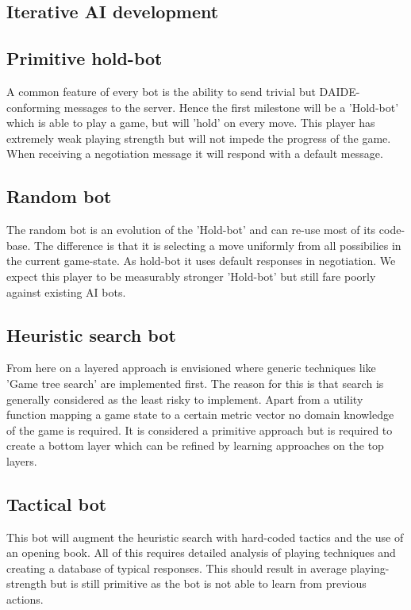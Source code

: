 \documentclass[12pt]{article}
\begin{document}
\begin{itemize}
\section{Iterative AI development}

\subsection{Primitive hold-bot}
A common feature of every bot is the ability to send trivial but DAIDE-
conforming messages to the server. Hence the first milestone will
be a 'Hold-bot' which is able to play a game, but will 'hold' on
every move. This player has extremely weak playing strength but will
not impede the progress of the game. When receiving a negotiation
message it will respond with a default message.

\subsection{Random bot}
The random bot is an evolution of the 'Hold-bot' and can re-use most
of its code-base. The difference is that it is selecting a move
uniformly from all possibilies in the current game-state. As hold-bot it 
uses default responses in negotiation. We expect this player to be measurably
stronger 'Hold-bot' but still fare poorly against existing AI bots.

\subsection{Heuristic search bot}
From here on a layered approach is envisioned where generic techniques
like 'Game tree search' are implemented first. The reason for this is that 
search is generally considered as the least risky to implement. Apart from
a utility function mapping a game state to a certain metric vector no 
domain knowledge of the game is required. It is considered a primitive
approach but is required to create a bottom layer which can be refined
by learning approaches on the top layers.

\subsection{Tactical bot}
This bot will augment the heuristic search with hard-coded tactics and
the use of an opening book. All of this requires detailed analysis of 
playing techniques and creating a database of typical responses. This should
result in average playing-strength but is still primitive as the bot is not
able to learn from previous actions.


\end{itemize}
\end{document}
